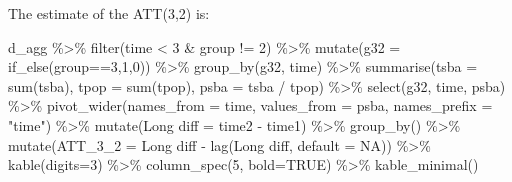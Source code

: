 \documentclass[
]{article}
\newenvironment{Shaded}{\begin{snugshade}}{\end{snugshade}}
\newcommand{\AttributeTok}[1]{\textcolor[rgb]{0.77,0.63,0.00}{#1}}
\newcommand{\ConstantTok}[1]{\textcolor[rgb]{0.00,0.00,0.00}{#1}}
\newcommand{\DecValTok}[1]{\textcolor[rgb]{0.00,0.00,0.81}{#1}}
\newcommand{\FunctionTok}[1]{\textcolor[rgb]{0.00,0.00,0.00}{#1}}
\newcommand{\NormalTok}[1]{#1}
\newcommand{\OtherTok}[1]{\textcolor[rgb]{0.56,0.35,0.01}{#1}}
\newcommand{\SpecialCharTok}[1]{\textcolor[rgb]{0.00,0.00,0.00}{#1}}
\newcommand{\StringTok}[1]{\textcolor[rgb]{0.31,0.60,0.02}{#1}}
\begin{document}
The estimate of the ATT(3,2) is:

\begin{Shaded}
\begin{Highlighting}[]
\NormalTok{d\_agg }\SpecialCharTok{\%\textgreater{}\%} \FunctionTok{filter}\NormalTok{(time }\SpecialCharTok{\textless{}} \DecValTok{3} \SpecialCharTok{\&}\NormalTok{ group }\SpecialCharTok{!=} \DecValTok{2}\NormalTok{) }\SpecialCharTok{\%\textgreater{}\%}
  \FunctionTok{mutate}\NormalTok{(}\AttributeTok{g32 =} \FunctionTok{if\_else}\NormalTok{(group}\SpecialCharTok{==}\DecValTok{3}\NormalTok{,}\DecValTok{1}\NormalTok{,}\DecValTok{0}\NormalTok{)) }\SpecialCharTok{\%\textgreater{}\%}
  \FunctionTok{group\_by}\NormalTok{(g32, time) }\SpecialCharTok{\%\textgreater{}\%}
  \FunctionTok{summarise}\NormalTok{(}\AttributeTok{tsba =} \FunctionTok{sum}\NormalTok{(tsba),}
            \AttributeTok{tpop =} \FunctionTok{sum}\NormalTok{(tpop),}
            \AttributeTok{psba =}\NormalTok{ tsba }\SpecialCharTok{/}\NormalTok{ tpop) }\SpecialCharTok{\%\textgreater{}\%}
  \FunctionTok{select}\NormalTok{(g32, time, psba) }\SpecialCharTok{\%\textgreater{}\%}
  \FunctionTok{pivot\_wider}\NormalTok{(}\AttributeTok{names\_from =}\NormalTok{ time, }\AttributeTok{values\_from =}\NormalTok{ psba,}
              \AttributeTok{names\_prefix =} \StringTok{"time"}\NormalTok{) }\SpecialCharTok{\%\textgreater{}\%}
  \FunctionTok{mutate}\NormalTok{(}\StringTok{\textasciigrave{}}\AttributeTok{Long diff}\StringTok{\textasciigrave{}} \OtherTok{=} \StringTok{\textasciigrave{}}\AttributeTok{time2}\StringTok{\textasciigrave{}} \SpecialCharTok{{-}} \StringTok{\textasciigrave{}}\AttributeTok{time1}\StringTok{\textasciigrave{}}\NormalTok{) }\SpecialCharTok{\%\textgreater{}\%}
  \FunctionTok{group\_by}\NormalTok{() }\SpecialCharTok{\%\textgreater{}\%}
  \FunctionTok{mutate}\NormalTok{(}\AttributeTok{ATT\_3\_2 =} \StringTok{\textasciigrave{}}\AttributeTok{Long diff}\StringTok{\textasciigrave{}} \SpecialCharTok{{-}} \FunctionTok{lag}\NormalTok{(}\StringTok{\textasciigrave{}}\AttributeTok{Long diff}\StringTok{\textasciigrave{}}\NormalTok{, }\AttributeTok{default =} \ConstantTok{NA}\NormalTok{)) }\SpecialCharTok{\%\textgreater{}\%}
  \FunctionTok{kable}\NormalTok{(}\AttributeTok{digits=}\DecValTok{3}\NormalTok{) }\SpecialCharTok{\%\textgreater{}\%}
  \FunctionTok{column\_spec}\NormalTok{(}\DecValTok{5}\NormalTok{, }\AttributeTok{bold=}\ConstantTok{TRUE}\NormalTok{) }\SpecialCharTok{\%\textgreater{}\%}
  \FunctionTok{kable\_minimal}\NormalTok{()}
\end{Highlighting}
\end{Shaded}
\end{document}
